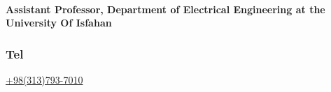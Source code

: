 \documentclass[a4paper]{article}
\begin{document}
\begin{multicols}{3}[]
        \paragraph{Assistant Professor, Department of Electrical Engineering at the University Of Isfahan}
        \subsubsection{Tel} {\large\href{tel:+983137937010}{+98(313)793-7010}}
        
        \Large\href{mailto:m.kazemi@eng.ui.ac.ir}{}
        \Large\href{https://engold.ui.ac.ir/~m.kazemi}{}
        \Large\href{https://ir.linkedin.com/in/mohammad-kazemi-602a2722}{}
        \end{multicols}
\end{document}
